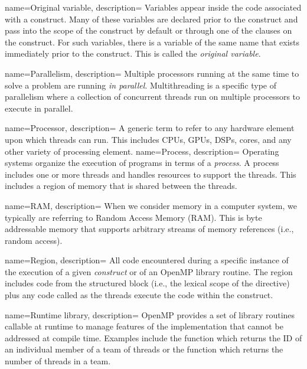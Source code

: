 {
   name={Original variable},
   description={
Variables appear inside the code associated with a construct.  Many of these variables are declared prior to 
the construct and pass into the scope of the construct by default or through one of the clauses on the construct.
For such variables, there is a variable of the same name that exists immediately prior to the construct. 
This is called the \emph{original variable}.}
}


{
   name={Parallelism},
   description={
   Multiple processors running at the same time to solve a problem are running \emph{in parallel}.
   Multithreading is a specific type of parallelism where a collection of concurrent threads  run on multiple processors
   to execute in parallel. 
   }
}   

  
{
   name={Processor},
   description={
   A generic term to refer to any hardware element upon which threads can run.  This includes
   CPUs, GPUs, DSPs, cores, and any other variety of processing element. 
   }
}   
{
   name={Process},
   description={
   Operating systems organize the execution of programs in terms of a \emph{process}.  A process 
   includes one or more threads and handles  resources to support the threads.  This includes
   a region of memory that is shared between the threads.
   }
}   

{
   name={RAM},
   description={
   When we consider memory in a computer system, we typically are referring to
   Random Access Memory (RAM).  This is byte addressable memory that supports arbitrary 
   streams of memory references (i.e., random access).    
}
}

{
   name={Region},
   description={
All code encountered during a specific instance of the execution of a given 
\emph{construct} or of an OpenMP library routine.  The region includes
code from the structured block (i.e., the lexical scope of the directive) plus any 
code called as the threads execute the code within the construct.    
}
}


{
   name={Runtime library},
   description={
   OpenMP provides a set of library routines callable at runtime to manage features of the implementation that cannot
   be addressed at compile time.  Examples include the  function which returns the ID 
   of an individual member of a team of threads or the  function which returns the number of threads
   in a team.  
   }
}   


